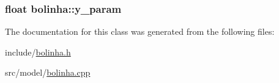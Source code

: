 \subsubsection[{\texorpdfstring{y\+\_\+param}{y_param}}]{\setlength{\rightskip}{0pt plus 5cm}float bolinha\+::y\+\_\+param\hspace{0.3cm}{\ttfamily [private]}}\hypertarget{classbolinha_a2fe551614672e64a4f34ecdd226de4ca}{}\label{classbolinha_a2fe551614672e64a4f34ecdd226de4ca}


The documentation for this class was generated from the following files\+:\begin{DoxyCompactItemize}
\item 
include/\hyperlink{bolinha_8h}{bolinha.\+h}\item 
src/model/\hyperlink{bolinha_8cpp}{bolinha.\+cpp}\end{DoxyCompactItemize}
